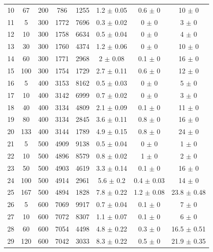 \documentclass[11pt]{article}
\begin{document}
\begin{table}[]
{\begin{tabular}{cccccccc}
				10 & 67 & 200 & 786 & 1255 & 1.2 $\pm$ 0.05 & 0.6 $\pm$ 0 & 10 $\pm$ 0 \\
				\rowcolor[HTML]{EFEFEF} 
				11 & 5 & 300 & 1772 & 7696 & 0.3 $\pm$ 0.02 & 0 $\pm$ 0 & 3 $\pm$ 0 \\
				\rowcolor[HTML]{EFEFEF} 
				12 & 10 & 300 & 1758 & 6634 & 0.5 $\pm$ 0.04 & 0 $\pm$ 0 & 4 $\pm$ 0 \\
				\rowcolor[HTML]{EFEFEF} 
				13 & 30 & 300 & 1760 & 4374 & 1.2 $\pm$ 0.06 & 0 $\pm$ 0 & 10 $\pm$ 0 \\
				\rowcolor[HTML]{EFEFEF} 
				14 & 60 & 300 & 1771 & 2968 & 2 $\pm$ 0.08 & 0.1 $\pm$ 0 & 16 $\pm$ 0 \\
				\rowcolor[HTML]{EFEFEF} 
				15 & 100 & 300 & 1754 & 1729 & 2.7 $\pm$ 0.11 & 0.6 $\pm$ 0 & 12 $\pm$ 0 \\
				16 & 5 & 400 & 3153 & 8162 & 0.5 $\pm$ 0.03 & 0 $\pm$ 0 & 5 $\pm$ 0 \\
				17 & 10 & 400 & 3142 & 6999 & 0.7 $\pm$ 0.02 & 0 $\pm$ 0 & 3 $\pm$ 0 \\
				18 & 40 & 400 & 3134 & 4809 & 2.1 $\pm$ 0.09 & 0.1 $\pm$ 0 & 11 $\pm$ 0 \\
				19 & 80 & 400 & 3134 & 2845 & 3.6 $\pm$ 0.11 & 0.8 $\pm$ 0 & 16 $\pm$ 0 \\
				20 & 133 & 400 & 3144 & 1789 & 4.9 $\pm$ 0.15 & 0.8 $\pm$ 0 & 24 $\pm$ 0 \\
				\rowcolor[HTML]{EFEFEF} 
				21 & 5 & 500 & 4909 & 9138 & 0.5 $\pm$ 0.04 & 0 $\pm$ 0 & 1 $\pm$ 0 \\
				\rowcolor[HTML]{EFEFEF} 
				22 & 10 & 500 & 4896 & 8579 & 0.8 $\pm$ 0.02 & 1 $\pm$ 0 & 2 $\pm$ 0 \\
				\rowcolor[HTML]{EFEFEF} 
				23 & 50 & 500 & 4903 & 4619 & 3.3 $\pm$ 0.14 & 0.1 $\pm$ 0 & 16 $\pm$ 0 \\
				\rowcolor[HTML]{EFEFEF} 
				24 & 100 & 500 & 4914 & 2961 & 5.6 $\pm$ 0.2 & 0.4 $\pm$ 0.03 & 14 $\pm$ 0 \\
				\rowcolor[HTML]{EFEFEF} 
				25 & 167 & 500 & 4894 & 1828 & 7.8 $\pm$ 0.22 & 1.2 $\pm$ 0.08 & 23.8 $\pm$ 0.48 \\
				26 & 5 & 600 & 7069 & 9917 & 0.7 $\pm$ 0.04 & 0.1 $\pm$ 0 & 7 $\pm$ 0 \\
				27 & 10 & 600 & 7072 & 8307 & 1.1 $\pm$ 0.07 & 0.1 $\pm$ 0 & 6 $\pm$ 0 \\
				28 & 60 & 600 & 7054 & 4498 & 4.8 $\pm$ 0.22 & 0.3 $\pm$ 0 & 16.5 $\pm$ 0.51 \\
				29 & 120 & 600 & 7042 & 3033 & 8.3 $\pm$ 0.22 & 0.5 $\pm$ 0 & 21.9 $\pm$ 0.35 \\

\end{tabular}}
\end{table}
\end{document}
